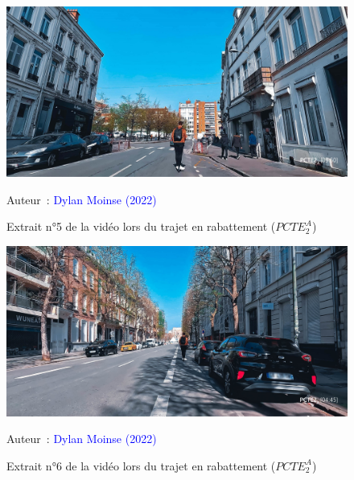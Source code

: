     \begin{figure}[h!]\vspace*{4pt}
        \caption*{Extrait n°5 de la vidéo lors du trajet en rabattement (\(PCTE^{A}_{2}\))}
        \centerline{\includegraphics[width=0.75\columnwidth]{src/Figures/Annexes/Extrait_Video_PCTE2_Access_5.jpg}}
        \vspace{5pt}
        \begin{flushright}\scriptsize{
        Auteur~: \textcolor{blue}{Dylan Moinse (2022)}
        }\end{flushright}
    \end{figure}

    \begin{figure}[h!]\vspace*{4pt}
        \caption*{Extrait n°6 de la vidéo lors du trajet en rabattement (\(PCTE^{A}_{2}\))}
        \centerline{\includegraphics[width=0.75\columnwidth]{src/Figures/Annexes/Extrait_Video_PCTE2_Access_6.jpg}}
        \vspace{5pt}
        \begin{flushright}\scriptsize{
        Auteur~: \textcolor{blue}{Dylan Moinse (2022)}
        }\end{flushright}
    \end{figure}

